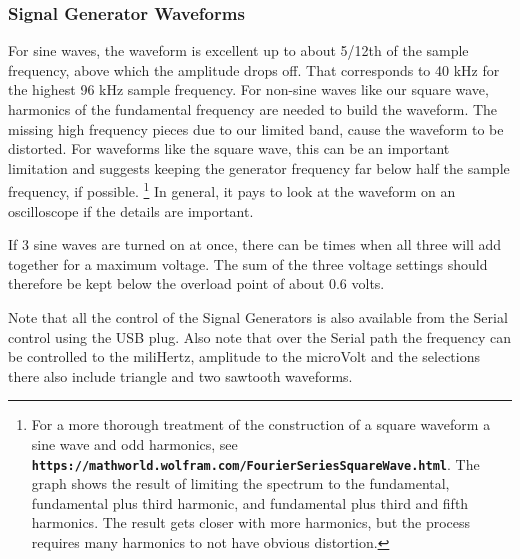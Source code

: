\subsubsection{Signal Generator Waveforms}
\label{subsect:ASGWaveforms}
For sine waves, the waveform is excellent up to about 5/12th of the sample frequency, above which the amplitude drops off.   That corresponds to 40 kHz for the highest 96 kHz sample frequency.  For non-sine waves like our square wave, harmonics of the fundamental frequency are needed to build the waveform.  The missing high frequency pieces due to our limited band, cause the waveform to be distorted.  For waveforms like the square wave, this can be an important limitation and suggests keeping the generator frequency far below half the sample frequency, if possible. 
%
\footnote{For a more thorough treatment of the construction of a square waveform a sine wave and odd harmonics, see  \linebreak \textbf{\texttt{https://mathworld.wolfram.com/FourierSeriesSquareWave.html}}. \linebreak  The graph shows the result of limiting the spectrum to the fundamental, fundamental plus third harmonic, and fundamental plus third and  fifth harmonics.  The result gets closer with more harmonics, but the process requires many harmonics to not have obvious distortion. }
%
 In general, it pays to look at the waveform on an oscilloscope if the details are important.

If 3 sine waves are turned on at once, there can be times when all three will add together for a maximum voltage.  The sum of the three voltage settings should therefore be kept below the overload point of about 0.6 volts.

Note that all the control of the Signal Generators is also available from the Serial control using the USB plug.  Also note that over the Serial path the frequency can be controlled to the miliHertz, amplitude to the microVolt and the selections there also include triangle and two sawtooth waveforms.

